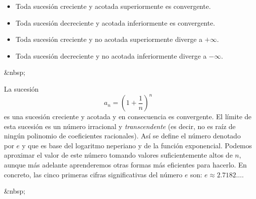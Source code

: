 \begin{proposicion-br} 
\begin{itemize}
\item Toda sucesión creciente y acotada superiormente es convergente.
\item Toda sucesión decreciente y acotada inferiormente es convergente.
\item Toda sucesión creciente y no acotada superiormente diverge a $+\infty$.
\item Toda sucesión decreciente y no acotada inferiormente diverge a $-\infty$.
\end{itemize}
\end{proposicion-br}
\begin{rawhtml}
&nbsp;
\end{rawhtml}
\begin{ejemplo}
La sucesión 
\[
a_n=\left(1+\frac{1}{n}\right)^n
\]
es una sucesión creciente y acotada y en consecuencia es convergente.
El límite de esta sucesión es un número irracional y \emph{transcendente} (es decir, no es raíz de ningún polinomio de coeficientes racionales).
Así se define el número denotado por $e$ y que es base del logaritmo neperiano y de la función exponencial.
Podemos aproximar el valor de este número tomando valores suficientemente altos de $n$, aunque más adelante aprenderemos otras formas más eficientes para hacerlo.
En concreto, las cinco primeras cifras significativas del número $e$ son: 
$e\approx 2.7182\dots$.\fej
\end{ejemplo}
\begin{rawhtml}
&nbsp;
\end{rawhtml}
